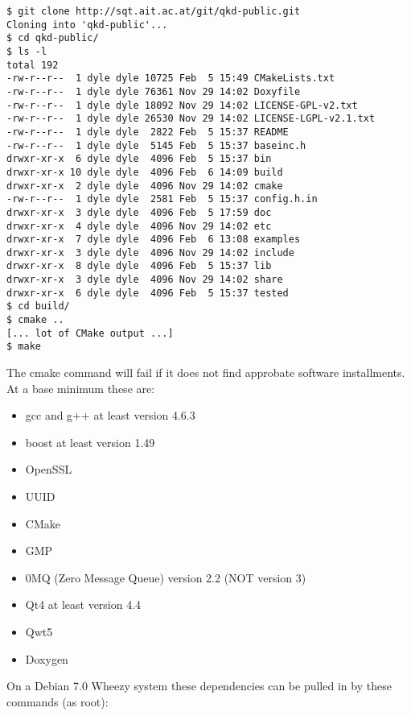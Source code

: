 \begin{minipage}{0.9\textwidth}
\bigskip
\begin{verbatim}
$ git clone http://sqt.ait.ac.at/git/qkd-public.git
Cloning into 'qkd-public'...
$ cd qkd-public/
$ ls -l
total 192
-rw-r--r--  1 dyle dyle 10725 Feb  5 15:49 CMakeLists.txt
-rw-r--r--  1 dyle dyle 76361 Nov 29 14:02 Doxyfile
-rw-r--r--  1 dyle dyle 18092 Nov 29 14:02 LICENSE-GPL-v2.txt
-rw-r--r--  1 dyle dyle 26530 Nov 29 14:02 LICENSE-LGPL-v2.1.txt
-rw-r--r--  1 dyle dyle  2822 Feb  5 15:37 README
-rw-r--r--  1 dyle dyle  5145 Feb  5 15:37 baseinc.h
drwxr-xr-x  6 dyle dyle  4096 Feb  5 15:37 bin
drwxr-xr-x 10 dyle dyle  4096 Feb  6 14:09 build
drwxr-xr-x  2 dyle dyle  4096 Nov 29 14:02 cmake
-rw-r--r--  1 dyle dyle  2581 Feb  5 15:37 config.h.in
drwxr-xr-x  3 dyle dyle  4096 Feb  5 17:59 doc
drwxr-xr-x  4 dyle dyle  4096 Nov 29 14:02 etc
drwxr-xr-x  7 dyle dyle  4096 Feb  6 13:08 examples
drwxr-xr-x  3 dyle dyle  4096 Nov 29 14:02 include
drwxr-xr-x  8 dyle dyle  4096 Feb  5 15:37 lib
drwxr-xr-x  3 dyle dyle  4096 Nov 29 14:02 share
drwxr-xr-x  6 dyle dyle  4096 Feb  5 15:37 tested
$ cd build/
$ cmake ..
[... lot of CMake output ...]
$ make
\end{verbatim}
\medskip
\end{minipage}

The cmake command will fail if it does not find approbate software installments. At a base minimum these are:

\begin{itemize}

    \item gcc and g++ at least version 4.6.3
    \item boost at least version 1.49
    \item OpenSSL
    \item UUID
    \item CMake
    \item GMP
    \item 0MQ (Zero Message Queue) version 2.2 (NOT version 3)
    \item Qt4 at least version 4.4
    \item Qwt5
    \item Doxygen

\end{itemize}

\clearpage

On a Debian 7.0 Wheezy system these dependencies can be pulled in by these commands (as root):

